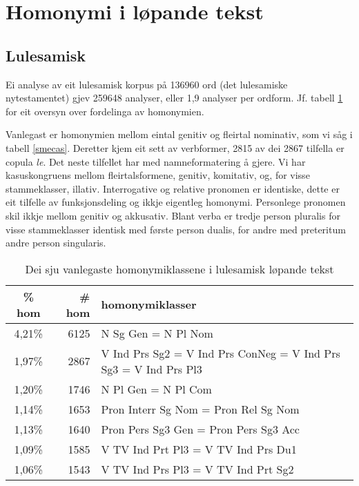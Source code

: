 \documentclass[a4paper,norsk]{article}
\begin{document}
\section{Homonymi i løpande tekst}



\subsection{Lulesamisk} 
 
Ei analyse av eit lulesamisk korpus på 136960 ord (det lulesamiske nytestamentet) gjev 259648 analyser, eller 1,9 analyser per ordform. Jf. tabell \ref{smjhom} for eit oversyn over fordelinga av homonymien.%

Vanlegast er homonymien mellom eintal genitiv og fleirtal nominativ, som vi såg i tabell \ref{smecas}. Deretter kjem eit sett av verbformer, 2815 av dei 2867 tilfella er copula \textit{le}. Det neste tilfellet har med namneformatering å gjere. Vi har kasuskongruens mellom fleirtalsformene, genitiv, komitativ, og, for visse stammeklasser, illativ. Interrogative og relative pronomen er identiske, dette er eit tilfelle av funksjonsdeling og ikkje eigentleg homonymi. Personlege pronomen skil ikkje mellom genitiv og akkusativ. Blant verba er tredje person pluralis for visse stammeklasser identisk med første person dualis, for andre med preteritum andre person singularis.%

\begin{table}[htdp]
\caption{Dei sju vanlegaste homonymiklassene i lulesamisk løpande tekst}
\begin{center}
\begin{tabular}{|c|r|l|}
\hline
\% hom & \# hom & homonymiklasser \\
\hline
4,21\% & 6125 & N Sg Gen  =  N Pl Nom  \\
1,97\% & 2867 & V Ind Prs Sg2  =  V Ind Prs ConNeg  =  V Ind Prs Sg3  =  V Ind Prs Pl3  \\
1,20\% & 1746 & N Pl Gen  =  N Pl Com  \\
1,14\% & 1653 & Pron Interr Sg Nom  =  Pron Rel Sg Nom  \\
1,13\% & 1640 & Pron Pers Sg3 Gen  =  Pron Pers Sg3 Acc  \\
1,09\% & 1585 & V TV Ind Prt Pl3  =  V TV Ind Prs Du1  \\
1,06\% & 1543 & V TV Ind Prs Pl3  =  V TV Ind Prt Sg2  \\
\hline
\end{tabular}
\end{center}
\label{smjhom}
\end{table}%
\end{document}
